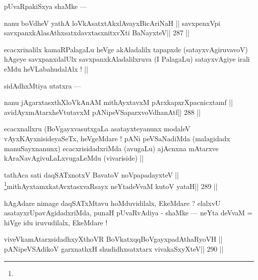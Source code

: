 \begin{artha}
pUvaRpakiSxya shaMke ---
\end{artha}

\begin{shl}
nanu boVdheV yathA loVkAsatxtAkxlAvayxBicAriNaH ||
savxpenxV\s pi savxpanxkAlasAthxsatxdavxtasxnitxvXti BaNayxteV\hfill || 287 ||
\end{shl}

\begin{artha}
ecacxrinalilx kamaRPalagaLu heVge akAladalilx tapapxde (satayxvAgiruvavoV) hAgeye savxpanxdalUlx savxpanxkAladalilxruva (I PalagaLu) satayxvAgiye irali eMdu heVLabahudalAlx ! ||
\end{artha}

\begin{artha}
sidAdhxMtiya utatxra ---
\end{artha}

\begin{shl}
nanu jAgarxtasxthXloVkAnAM mithAyxtavxM pArxkapxrXpacnicxtamf ||
avidAyxmAtarxheVtutavxM pANipeVSaparxvoVdhanAtf\hfill || 288 ||
\end{shl}

\begin{artha}
ecacxnallxru (BoVgayxvasutxgaLa asatayxteyanunx modaleV vAyxKAyxnisideyaSeTx, heVgeMdare ! pANi peVSaNadiMda (malagidadx manuSayxnanunx) ecacxrisidadxriMda (avugaLu) ajAcnxna mAtarxve kAraNavAgivuLaLxvugaLeMdu (vivariside) ||
\end{artha}

\begin{shl}
tathAca sati daqSATxnotxV BavatoV noVpapadayxteV ||
\footnote[1]{}mithAyxtamxkatAvxtasxvaRsayx neYtadeVvaM kutoV yataH\hfill || 289 ||
\end{shl}

\begin{artha}
hAgAdare nimage daqSATxMtavu hoMduvidilalx, EkeMdare ? elalxvU asatayxrUpavAgidadxriMda, punaH pUvaRvAdiya - shaMke --- neYta deVvaM = hiVge idu iruvudilalx, EkeMdare !
\end{artha}

\begin{shl}
\footnotemark[2]viveVkamAtarxsidadhxyXthoVR BoVkatxqqBoVgayxpadAthaRyoVH ||
pANipeVSAdikoV garxnathxH shudidhxsatxtarx vivakaSxyXteV\hfill || 290 ||
\end{shl}

